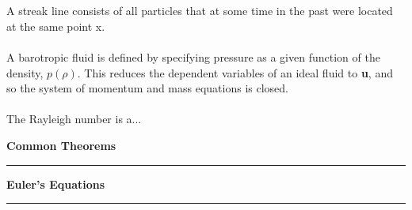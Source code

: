 \documentclass[12pt]{article}
\begin{document}
\begin{flushleft}
\\~\\
A streak line consists of all particles that at some time in the past were located at the same point x.
\\~\\
A barotropic fluid is defined by specifying pressure as a given function of the density, $p(\rho)$. This reduces the dependent variables of an ideal fluid to \textbf{u}, and so the system of momentum and mass equations is closed.
\\~\\
The Rayleigh number is a...
\end{flushleft}

\pagebreak

\begin{huge}
\begin{center}
\textbf{Common Theorems}
\noindent\rule{16.5cm}{0.4pt}
\end{center}
\end{huge}

\begin{flushleft}

\end{flushleft}
\pagebreak

\begin{huge}
\begin{center}
\textbf{Euler's Equations}
\noindent\rule{16.5cm}{0.4pt}
\end{center}
\end{huge}
\end{document}
